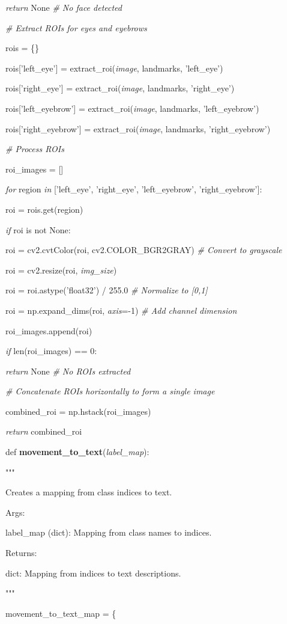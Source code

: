 \documentclass[
]{article}
\begin{document}
\emph{return} None \emph{\# No face detected}

\emph{\# Extract ROIs for eyes and eyebrows}

rois = \{\}

rois{[}'left\_eye'{]} = extract\_roi(\emph{image}, landmarks, 'left\_eye')

rois{[}'right\_eye'{]} = extract\_roi(\emph{image}, landmarks, 'right\_eye')

rois{[}'left\_eyebrow'{]} = extract\_roi(\emph{image}, landmarks, 'left\_eyebrow')

rois{[}'right\_eyebrow'{]} = extract\_roi(\emph{image}, landmarks, 'right\_eyebrow')

\emph{\# Process ROIs}

roi\_images = {[}{]}

\emph{for} region \emph{in} {[}'left\_eye', 'right\_eye', 'left\_eyebrow', 'right\_eyebrow'{]}:

roi = rois.get(region)

\emph{if} roi is not None:

roi = cv2.cvtColor(roi, cv2.COLOR\_BGR2GRAY) \emph{\# Convert to grayscale}

roi = cv2.resize(roi, \emph{img\_size})

roi = roi.astype('float32') / 255.0 \emph{\# Normalize to {[}0,1{]}}

roi = np.expand\_dims(roi, \emph{axis}=-1) \emph{\# Add channel dimension}

roi\_images.append(roi)

\emph{if} len(roi\_images) == 0:

\emph{return} None \emph{\# No ROIs extracted}

\emph{\# Concatenate ROIs horizontally to form a single image}

combined\_roi = np.hstack(roi\_images)

\emph{return} combined\_roi

def \textbf{movement\_to\_text}(\emph{label\_map}):

"""

Creates a mapping from class indices to text.

Args:

label\_map (dict): Mapping from class names to indices.

Returns:

dict: Mapping from indices to text descriptions.

"""

movement\_to\_text\_map = \{
\end{document}
